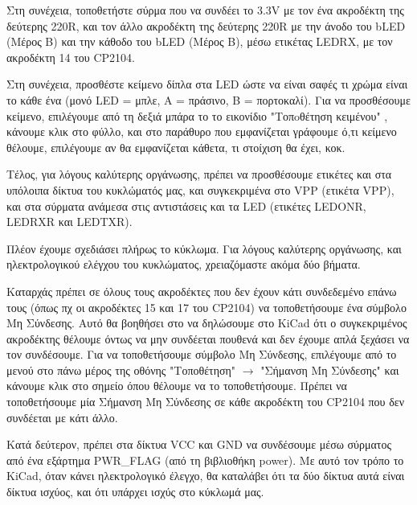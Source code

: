 \documentclass[a4paper]{article}
\begin{document}
Στη συνέχεια, τοποθετήστε σύρμα που να συνδέει το 3.3V με τον ένα ακροδέκτη της δεύτερης 220R, και τον άλλο ακροδέκτη της δεύτερης 220R με την άνοδο του b\textenglish{LED} (Μέρος Β) και την κάθοδο του b\textenglish{LED} (Μέρος Β), μέσω ετικέτας \textenglish{LED}RX, με τον ακροδέκτη 14 του \textenglish{CP2104}.

Στη συνέχεια, προσθέστε κείμενο δίπλα στα \textenglish{LED} ώστε να είναι σαφές τι χρώμα είναι το κάθε ένα (μονό \textenglish{LED} = μπλε, A = πράσινο, B = πορτοκαλί). Για να προσθέσουμε κείμενο, επιλέγουμε από τη δεξιά μπάρα το το εικονίδιο "Τοπoθέτηση κειμένου" %
, κάνουμε κλικ στο φύλλο, και στο παράθυρο που εμφανίζεται γράφουμε ό,τι κείμενο θέλουμε, επιλέγουμε αν θα εμφανίζεται κάθετα, τι στοίχιση θα έχει, κοκ.

\begin{figure}
  \begin{center}
    \label{fig:kicad-main}
  \end{center}
\end{figure}

Τέλος, για λόγους καλύτερης οργάνωσης, πρέπει να προσθέσουμε ετικέτες και στα υπόλοιπα δίκτυα του κυκλώματός μας, και συγκεκριμένα στο VPP (ετικέτα VPP), και στα σύρματα ανάμεσα στις αντιστάσεις και τα \textenglish{LED} (ετικέτες \textenglish{LED}ONR, \textenglish{LED}RXR και \textenglish{LED}TXR).

Πλέον έχουμε σχεδιάσει πλήρως το κύκλωμα. Για λόγους καλύτερης οργάνωσης, και ηλεκτρολογικού ελέγχου του κυκλώματος, χρειαζόμαστε ακόμα δύο βήματα.

Καταρχάς πρέπει σε όλους τους ακροδέκτες που δεν έχουν κάτι συνδεδεμένο επάνω τους (όπως πχ οι ακροδέκτες 15 και 17 του \textenglish{CP2104}) να τοποθετήσουμε ένα σύμβολο Μη Σύνδεσης. Αυτό θα βοηθήσει στο να δηλώσουμε στο \textenglish{KiCad} ότι ο συγκεκριμένος ακροδέκτης θέλουμε όντως να μην συνδέεται πουθενά και δεν έχουμε απλά ξεχάσει να τον συνδέσουμε. Για να τοποθετήσουμε σύμβολο Μη Σύνδεσης, επιλέγουμε από το μενού στο πάνω μέρος της οθόνης "Τοποθέτηση" $\rightarrow$ "Σήμανση Μη Σύνδεσης" και κάνουμε κλικ στο σημείο όπου θέλουμε να το τοποθετήσουμε. Πρέπει να τοποθετήσουμε μία Σήμανση Μη Σύνδεσης σε κάθε ακροδέκτη του \textenglish{CP2104} που δεν συνδέεται με κάτι άλλο.

Κατά δεύτερον, πρέπει στα δίκτυα VCC και GND να συνδέσουμε μέσω σύρματος από ένα εξάρτημα PWR\_FLAG (από τη βιβλιοθήκη power). Με αυτό τον τρόπο το \textenglish{KiCad}, όταν κάνει ηλεκτρολογικό έλεγχο, θα καταλάβει ότι τα δύο δίκτυα αυτά είναι δίκτυα ισχύος, και ότι υπάρχει ισχύς στο κύκλωμά μας.
\end{document}
